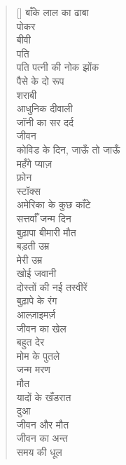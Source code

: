 \begin{verse}[\versewidth]\texthindi{
बाँके लाल का ढाबा\\
पोकर\\
बीवी\\
पति\\
पति पत्नी की नोक झोंक\\
पैसे के दो रूप\\
शराबी\\
आधुनिक दीवाली\\
जॉनी का सर दर्द\\
जीवन\\
कोविड के दिन, जाऊँ तो जाऊँ\\
महँगे प्याज़\\
फ़ोन\\
स्टॉक्स\\
अमेरिका के कुछ काँटे\\
सत्तर्वाँ जन्म दिन\\
बुढ़ापा बीमारी मौत\\
बड़ती उम्र\\
मेरी उम्र\\
खोई जवानी\\
दोस्तों की नई तस्वीरें\\
बुढ़ापे के रंग\\
आल्ज़ाइमर्ज़\\
जीवन का खेल\\
बहुत देर\\
मोम के पुतले\\
जन्म मरण\\
मौत\\
यादों के खँडरात\\
दुआ\\
जीवन और मौत\\
जीवन का अन्त\\
समय की धूल
}
\end{verse}
